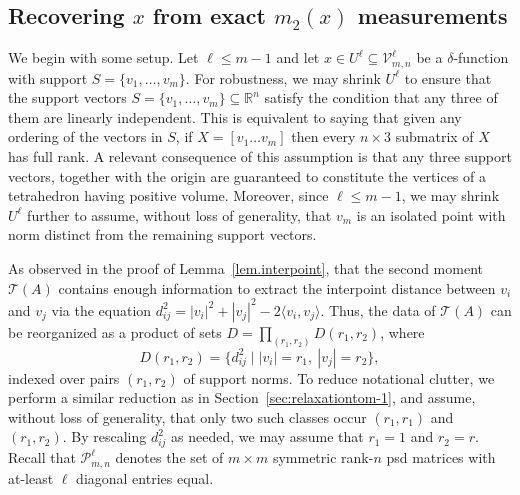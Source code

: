 \documentclass{article}
\theoremstyle{definition}
\renewcommand{\P}{\mathcal{P}}
\newcommand{\ip}[2]{\langle {#1}, {#2} \rangle}
\renewcommand{\|}{|}
\renewcommand{\t}{\mathcal{T}}
\begin{document}
\subsection{Recovering $x$ from exact $m_2(x)$ measurements}\label{sec:noiseless}
We begin with some setup. Let $\ell \leq m-1$ and let $x\in U^\ell \subseteq \mathcal{V}^\ell_{m,n}$ be a $\delta$-function with support $S = \{v_1,\dots, v_m\}$. For robustness, we may shrink $U^\ell$ to ensure that the support vectors $S = \{v_1,\dots, v_m\} \subseteq \mathbb{R}^n$ satisfy the condition that any three of them are linearly independent. This is equivalent to saying that given any ordering of the vectors in $S$, 
if $X=[v_1 \ldots v_m]$ then every $n \times 3$ submatrix of $X$ has full rank. A relevant consequence of this assumption is that any three support vectors, together with the origin are guaranteed to constitute the vertices of a tetrahedron having positive volume. Moreover, since $\ell \leq m-1$, we may shrink $U^\ell$ further to assume, without loss of generality, that $v_m$ is an isolated point with norm distinct from the remaining support vectors.

As observed in the proof of Lemma~\ref{lem.interpoint}, that the second moment $\t(A)$ contains enough information to extract the interpoint distance between $v_i$ and $v_j$ via the equation $d_{ij}^2 = \|v_i\|^2 + \|v_j\|^2 -2\ip{v_i}{v_j}$. Thus, the data of $\t(A)$ can be reorganized as a product of sets $D= \prod_{(r_1, r_2)} D(r_1, r_2)$, where
$$
D(r_1,r_2) = \{d_{ij}^2 \mid \|v_i\| = r_1,\ \|v_j\| = r_2\},
$$
indexed over pairs $(r_1,r_2)$ of support norms. To reduce notational clutter, we perform a similar reduction as in Section~\ref{sec:relaxationtom-1}, and assume, without loss of generality, that only two such classes occur $(r_1, r_1)$ and $(r_1,r_2)$. By rescaling $d_{ij}^2$ as needed, we may assume that $r_1=1$ and $r_2=r$. Recall that $\P_{m,n}^\ell$ denotes the set of $m \times m$ symmetric rank-$n$ psd matrices with at-least $\ell$ diagonal entries equal. 
\end{document}
